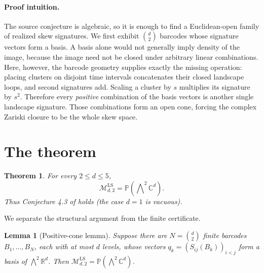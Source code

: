 \documentclass[11pt]{article}
\newtheorem{theorem}{Theorem}
\newtheorem{lemma}{Lemma}
\newcommand{\LS}{\mathrm{LS}}
\newcommand{\M}{\mathcal M}
\newcommand{\R}{\mathbb R}
\newcommand{\C}{\mathbb C}
\newcommand{\PP}{\mathbb P}
\newcommand{\wedgec}{\bigwedge\nolimits^{2}}
\begin{document}
\paragraph{Proof intuition.}
The source conjecture is algebraic, so it is enough to find a Euclidean-open family of realized skew signatures.  We first exhibit $\binom d2$ barcodes whose signature vectors form a basis.  A basis alone would not generally imply density of the image, because the image need not be closed under arbitrary linear combinations.  Here, however, the barcode geometry supplies exactly the missing operation: placing clusters on disjoint time intervals concatenates their closed landscape loops, and second signatures add.  Scaling a cluster by $s$ multiplies its signature by $s^2$.  Therefore every \emph{positive} combination of the basis vectors is another single landscape signature.  Those combinations form an open cone, forcing the complex Zariski closure to be the whole skew space.

\section{The theorem}

\begin{theorem}\label{thm:main}
For every $2\leq d\leq5$,
\[
 \M^{\LS}_{d,2}=\PP(\wedgec\C^d).
\]
Thus Conjecture 4.3 of \cite{source} holds (the case $d=1$ is vacuous).
\end{theorem}

We separate the structural argument from the finite certificate.

\begin{lemma}[Positive-cone lemma]\label{lem:cone}
Suppose there are $N=\binom d2$ finite barcodes $B_1,\ldots,B_N$, each with at most $d$ levels, whose vectors
$q_k=(S_{ij}(B_k))_{i<j}$ form a basis of $\wedgec\R^d$.  Then
$\M^{\LS}_{d,2}=\PP(\wedgec\C^d)$.
\end{lemma}
\end{document}
